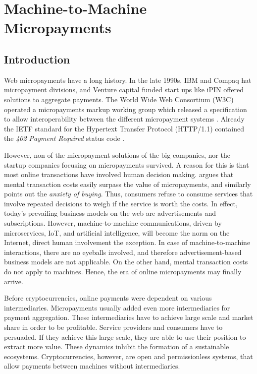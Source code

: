\chapter{Machine-to-Machine Micropayments}

\section{Introduction}

Web micropayments have a long history. In the late 1990s, IBM and Compaq hat micropayment divisions, and Venture capital funded start ups like iPIN offered solutions to aggregate payments. The World Wide Web Consortium (W3C) operated a micropayments markup working group which released a specification to allow interoperability between the different micropayment systems \parencite{w3c1999}. Already the IETF standard for the Hypertext Transfer Protocol (HTTP/1.1) contained the \emph{402 Payment Required} status code \parencite{fielding1999hypertext}.

However, non of the micropayment solutions of the big companies, nor the startup companies focusing on micropayments survived. A reason for this is that most online transactions have involved human decision making. \cite{szabo1999micropayments} argues that mental transaction costs easily surpass the value of micropayments, and similarly \cite{shirky2000} points out the \emph{anxiety of buying}. Thus, consumers refuse to consume services that involve repeated decisions to weigh if the service is worth the costs. In effect, today's prevailing business models on the web are advertisements and subscriptions. However, machine-to-machine communications, driven by microservices, IoT, and artificial intelligence, will become the norm on the Internet, direct human involvement the exception. In case of machine-to-machine interactions, there are no eyeballs involved, and therefore advertisement-based business models are not applicable. On the other hand, mental transaction costs do not apply to machines. Hence, the era of online micropayments may finally arrive.

Before cryptocurrencies, online payments were dependent on various intermediaries. Micropayments usually added even more intermediaries for payment aggregation. These intermediaries have to achieve large scale and market share in order to be profitable. Service providers and consumers have to persuaded. If they achieve this large scale, they are able to use their position to extract more value. These dynamics inhibit the formation of a sustainable ecosystems. Cryptocurrencies, however, are open and permissionless systems, that allow payments between machines without intermediaries.

